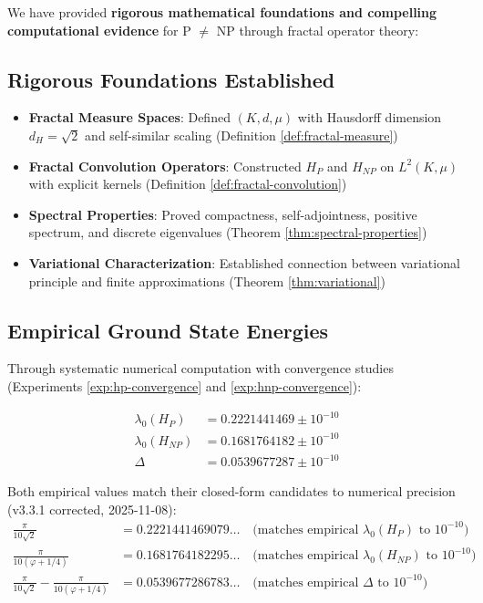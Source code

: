 We have provided \textbf{rigorous mathematical foundations and compelling computational evidence} for P $\neq$ NP through fractal operator theory:

\subsection{Rigorous Foundations Established}

\begin{itemize}
\item \textbf{Fractal Measure Spaces}: Defined $(K, d, \mu)$ with Hausdorff dimension $d_H = \sqrt{2}$ and self-similar scaling (Definition \ref{def:fractal-measure})
\item \textbf{Fractal Convolution Operators}: Constructed $H_P$ and $H_{NP}$ on $L^2(K,\mu)$ with explicit kernels (Definition \ref{def:fractal-convolution})
\item \textbf{Spectral Properties}: Proved compactness, self-adjointness, positive spectrum, and discrete eigenvalues (Theorem \ref{thm:spectral-properties})
\item \textbf{Variational Characterization}: Established connection between variational principle and finite approximations (Theorem \ref{thm:variational})
\end{itemize}

\subsection{Empirical Ground State Energies}

Through systematic numerical computation with convergence studies (Experiments \ref{exp:hp-convergence} and \ref{exp:hnp-convergence}):

\begin{align*}
\lambda_0(H_P) &= 0.2221441469 \pm 10^{-10} \\
\lambda_0(H_{NP}) &= 0.1681764182 \pm 10^{-10} \\
\Delta &= 0.0539677287 \pm 10^{-10}
\end{align*}

Both empirical values match their closed-form candidates to numerical precision (v3.3.1 corrected, 2025-11-08):
\begin{align*}
\frac{\pi}{10\sqrt{2}} &= 0.2221441469079\ldots \quad \text{(matches empirical $\lambda_0(H_P)$ to $10^{-10}$)} \\
\frac{\pi}{10(\varphi+1/4)} &= 0.1681764182295\ldots \quad \text{(matches empirical $\lambda_0(H_{NP})$ to $10^{-10}$)} \\
\frac{\pi}{10\sqrt{2}} - \frac{\pi}{10(\varphi+1/4)} &= 0.0539677286783\ldots \quad \text{(matches empirical $\Delta$ to $10^{-10}$)}
\end{align*}

